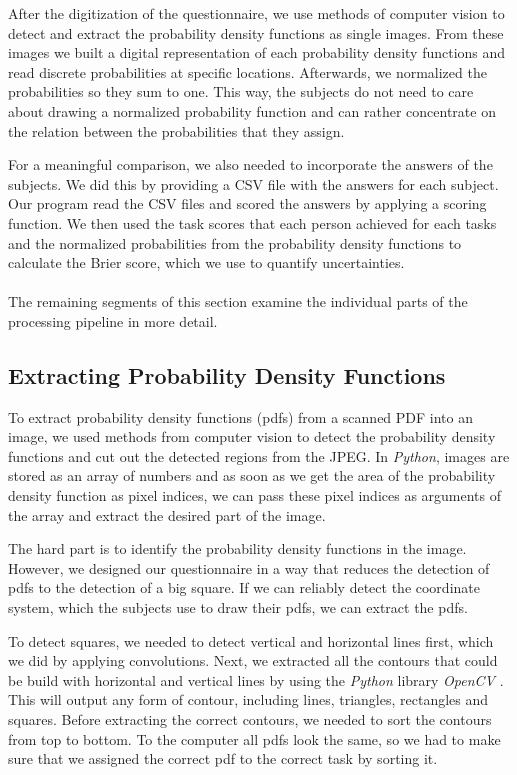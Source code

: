 \documentclass[../main/main.tex]{subfiles}
\begin{document}
	After the digitization of the questionnaire, we use methods of computer vision to detect and extract the probability density functions as single images. From these images we built a digital representation of each probability density functions and read discrete probabilities at specific locations. Afterwards, we normalized the probabilities so they sum to one. This way, the subjects do not need to care about drawing a normalized probability function and can rather concentrate on the relation between the probabilities that they assign.
	
	For a meaningful comparison, we also needed to incorporate the answers of the subjects. We did this by providing a CSV file with the answers for each subject. Our program read the CSV files and scored the answers by applying a scoring function. We then used the task scores that each person achieved for each tasks and the normalized probabilities from the probability density functions to calculate the Brier score, which we use to quantify uncertainties.
	\\\\
	The remaining segments of this section examine the individual parts of the processing pipeline in more detail.
	
	
	\subsection{Extracting Probability Density Functions}
	
	To extract probability density functions (pdfs) from a scanned PDF into an image, we used methods from computer vision to detect the probability density functions and cut out the detected regions from the JPEG. In \textit{Python}, images are stored as an array of numbers and as soon as we get the area of the probability density function as pixel indices, we can pass these pixel indices as arguments of the array and extract the desired part of the image.
	
	The hard part is to identify the probability density functions in the image. However, we designed our questionnaire in a way that reduces the detection of pdfs to the detection of a big square. If we can reliably detect the coordinate system, which the subjects use to draw their pdfs, we can extract the pdfs.
	
	To detect squares, we needed to detect vertical and horizontal lines first, which we did by applying convolutions. Next, we extracted all the contours that could be build with horizontal and vertical lines by using the \textit{Python} library \textit{OpenCV} \cite{bradski2008learning}. This will output any form of contour, including lines, triangles, rectangles and squares. Before extracting the correct contours, we needed to sort the contours from top to bottom. To the computer all pdfs look the same, so we had to make sure that we assigned the correct pdf to the correct task by sorting it. 
	
\end{document}
